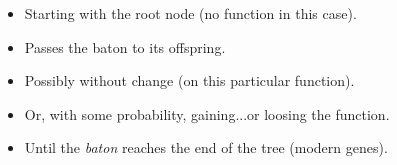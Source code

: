 \documentclass[aspectratio=169, 9pt, handout]{beamer}
\begin{document}
\begin{frame}[label=aphylographicalview,c]
\begin{minipage}[m]{.38\linewidth}
\begin{itemize}
			\item Starting with the root node (no function in this case).\pause
			\item Passes the baton to its offspring.\pause
			\item Possibly without change (on this particular function).\pause
			\item Or, with some probability, gaining...\pause[7] or loosing the function.\pause
			\item Until the \textit{baton} reaches the end of the tree (modern genes).\pause
		\end{itemize}
	\vfill\hfill\hyperlink{duplicationvsspeciation}{} %
	 \hyperlink{aphylographicalview}{}
	\end{minipage}
	
\end{frame}



\end{document}
